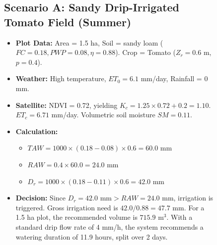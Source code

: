 \documentclass[3p,twocolumn]{elsarticle}
\begin{document}
\begin{figure}[t]
\subsection{Scenario A: Sandy Drip-Irrigated Tomato Field (Summer)}
\begin{itemize}
    \item \textbf{Plot Data:} Area = 1.5 ha, Soil = sandy loam ($FC = 0.18, PWP = 0.08, \eta = 0.88$). Crop = Tomato ($Z_r = 0.6$ m, $p = 0.4$).
    \item \textbf{Weather:} High temperature, $ET_0 = 6.1$ mm/day, Rainfall = 0 mm.
    \item \textbf{Satellite:} NDVI = 0.72, yielding $K_c = 1.25 \times 0.72 + 0.2 = 1.10$. $ET_c = 6.71$ mm/day. Volumetric soil moisture $SM = 0.11$.
    \item \textbf{Calculation:}
        \begin{itemize}
            \item $TAW = 1000 \times (0.18 - 0.08) \times 0.6 = 60.0$ mm
            \item $RAW = 0.4 \times 60.0 = 24.0$ mm
            \item $D_r = 1000 \times (0.18 - 0.11) \times 0.6 = 42.0$ mm
        \end{itemize}
    \item \textbf{Decision:} Since $D_r = 42.0\text{ mm} > RAW = 24.0\text{ mm}$, irrigation is triggered. Gross irrigation need is $42.0 / 0.88 = 47.7$ mm. For a 1.5 ha plot, the recommended volume is $715.9 \text{ m}^3$. With a standard drip flow rate of 4 mm/h, the system recommends a watering duration of 11.9 hours, split over 2 days.
\end{itemize}


\end{figure}
\end{document}
